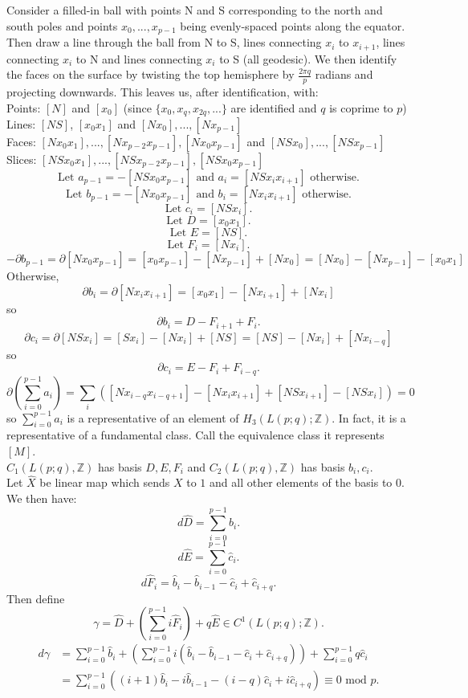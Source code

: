\documentclass{article}
\begin{document}
\noindent Consider a filled-in ball with points N and S corresponding to the north and south poles and points $x_0,...,x_{p-1}$ being evenly-spaced points along the equator. Then draw a line through the ball from N to S, lines connecting $x_i$ to $x_{i+1}$, lines connecting $x_i$ to N and lines connecting $x_i$ to S (all geodesic). We then identify the faces on the surface by twisting the top hemisphere by $\frac{2\pi q}{p}$ radians and projecting downwards. This leaves us, after identification, with:\\
Points: $[N]$ and $[x_0]$ (since $\{x_0,x_q,x_{2q},...\}$ are identified and $q$ is coprime to $p$)\\
Lines: $[NS]$, $[x_0x_1]$ and $[Nx_0],...,[Nx_{p-1}]$\\
Faces: $[Nx_0x_1],...,[Nx_{p-2}x_{p-1}],[Nx_0x_{p-1}]$ and $[NSx_0],...,[NSx_{p-1}]$\\
Slices: $[NSx_0x_1],...,[NSx_{p-2}x_{p-1}],[NSx_0x_{p-1}]$\\
\[\text{Let }a_{p-1}=-[NSx_0x_{p-1}]\text{ and }a_i=[NSx_ix_{i+1}]\text{ otherwise.}\]
\[\text{Let }b_{p-1}=-[Nx_0x_{p-1}]\text{ and }b_i=[Nx_ix_{i+1}]\text{ otherwise.}\]
\[\text{Let }c_i=[NSx_i].\]
\[\text{Let }D=[x_0x_1].\]
\[\text{Let }E=[NS].\]
\[\text{Let }F_i=[Nx_i].\]
\[-\partial b_{p-1}=\partial[Nx_0x_{p-1}]=[x_0x_{p-1}]-[Nx_{p-1}]+[Nx_0]=[Nx_0]-[Nx_{p-1}]-[x_0x_1]\]
Otherwise, \[\partial b_i=\partial[Nx_ix_{i+1}]=[x_0x_1]-[Nx_{i+1}]+[Nx_i]\]
so \[\partial b_i=D-F_{i+1}+F_i.\]
\[\partial c_i=\partial[NSx_i]=[Sx_i]-[Nx_i]+[NS]=[NS]-[Nx_i]+[Nx_{i-q}]\]
so \[\partial c_i=E-F_i+F_{i-q}.\]
\[\partial(\sum_{i=0}^{p-1}a_i)=\sum_i([Nx_{i-q}x_{i-q+1}]-[Nx_ix_{i+1}]+[NSx_{i+1}]-[NSx_i])=0\] so $\sum_{i=0}^{p-1}a_i$ is a representative of an element of $H_3(L(p;q);\mathbb{Z})$. In fact, it is a representative of a fundamental class. Call the equivalence class it represents $[M]$.\\
$C_1(L(p;q),\mathbb{Z})$ has basis $D,E,F_i$ and $C_2(L(p;q),\mathbb{Z})$ has basis $b_i,c_i$.\\
Let $\hat X$ be linear map which sends $X$ to $1$ and all other elements of the basis to $0$. We then have:\\
\[d\hat D=\sum_{i=0}^{p-1}\hat b_i.\]
\[d\hat E=\sum_{i=0}^{p-1}\hat c_i.\]
\[d\hat F_i=\hat b_i-\hat b_{i-1}-\hat c_i+\hat c_{i+q}.\]
Then define \[\gamma=\hat D + (\sum_{i=0}^{p-1}i\hat F_i)+q\hat E\in C^1(L(p;q);\mathbb{Z}).\]
\begin{align*}
d\gamma&=\sum_{i=0}^{p-1}\hat b_i+(\sum_{i=0}^{p-1}i(\hat b_i-\hat b_{i-1}-\hat c_i+\hat c_{i+q}))+\sum_{i=0}^{p-1}q\hat c_i\\
&=\sum_{i=0}^{p-1}((i+1)\hat b_i-i\hat b_{i-1}-(i-q)\hat c_i+i\hat c_{i+q})\equiv 0\text{ mod }p.
\end{align*}
\end{document}
